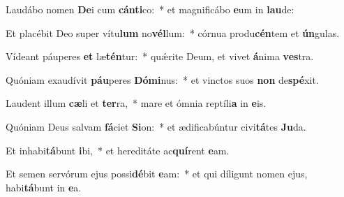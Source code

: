 \item Laudábo nomen \textbf{De}i cum \textbf{cán}\textbf{ti}co:~* et magnificábo \textbf{e}um in \textbf{lau}de:
\item Et placébit Deo super vítu\textbf{lum} no\textbf{vél}lum:~* córnua produ\textbf{cén}tem et \textbf{ún}gulas.
\item Vídeant páuperes \textbf{et} læ\textbf{tén}tur:~* quǽrite Deum, et vivet \textbf{á}nima \textbf{ves}tra.
\item Quóniam exaudívit \textbf{páu}peres \textbf{Dó}\textbf{mi}nus:~* et vinctos suos \textbf{non} de\textbf{spé}xit.
\item Laudent illum \textbf{cæ}li et \textbf{ter}ra,~* mare et ómnia reptíli\textbf{a} in \textbf{e}is.
\item Quóniam Deus salvam \textbf{fá}ciet \textbf{Si}on:~* et ædificabúntur civi\textbf{tá}tes \textbf{Ju}da.
\item Et inhabi\textbf{tá}bunt \textbf{i}bi,~* et hereditáte ac\textbf{quí}rent \textbf{e}am.
\item Et semen servórum ejus possi\textbf{dé}bit \textbf{e}am:~* et qui díligunt nomen ejus, habi\textbf{tá}bunt in \textbf{e}a.
